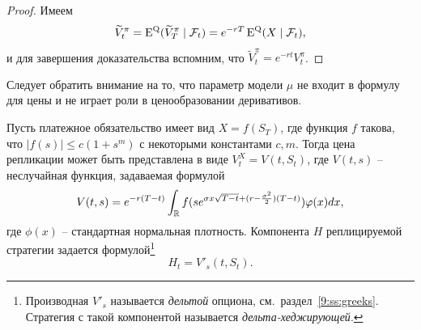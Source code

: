 \begin{proof}
Имеем
\[
\widetilde V_t^\pi = \operatorname{E}^{\mathrm{Q}} (\widetilde V_T^\pi \mid \mathcal{F}_t) = e^{-rT} \operatorname{E}^{\mathrm{Q}} (X \mid \mathcal{F}_t), 
\]  
и для завершения доказательства вспомним, что $\tilde V_t^\pi = e^{-rt} V_t^\pi$.
\end{proof}

\begin{remark}
Следует обратить внимание на то, что параметр модели $\mu$ не входит в формулу для цены и не играет роли в ценообразовании деривативов.
\end{remark}

\begin{corollary}
\label{9:c:path-independent}
Пусть платежное обязательство имеет вид $X=f(S_T)$, где функция $f$ такова, что $|f(s)| \le c(1+ s^m)$ с некоторыми константами $c,m$.
Тогда цена репликации может быть представлена в виде $V_t^X = V(t,S_t)$, где $V(t,s)$ -- неслучайная функция, задаваемая формулой
\begin{equation}
\label{9:markov-price-int}
V(t,s) = e^{-r(T-t)}  \int_{\mathbb{R}} f(se^{\sigma x \sqrt{T-t}  + (r-\frac{\sigma^2}{2})(T-t)}) \varphi(x) dx,  
\end{equation}
где $\phi(x)$ -- стандартная нормальная плотность.
Компонента $H$ реплицируемой стратегии задается формулой\footnote{Производная $V'_s$ называется \emph{дельтой} опциона, см.~раздел~\ref{9:ss:greeks}.
Стратегия с такой компонентой называется \emph{дельта-хеджирующей}.}
\begin{equation}
\label{9:delta-hedge}
H_t = V'_s(t,S_t).
\end{equation}
\end{corollary}
